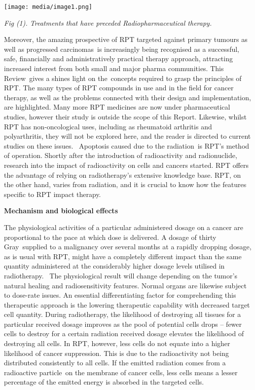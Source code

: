 \documentclass[
]{article}
\begin{document}
\texttt{[image: media/image1.png]}

\emph{Fig (1). Treatments that have preceded Radiopharmaceutical
therapy.}

Moreover, the amazing prospective of RPT targeted against primary
tumours as well as progressed carcinomas~is increasingly being
recognised as a successful, safe, financially and administratively
practical therapy approach, attracting increased interest from both
small and major pharma communities. This Review~gives a shines light on
the~concepts required to grasp the principles of RPT. The many types of
RPT compounds in use and in the field for cancer therapy, as well as the
problems connected with their design and implementation, are
highlighted. Many more RPT medicines are now under pharmaceutical
studies, however their study is outside the scope of this Report.
Likewise, whilst RPT has non-oncological uses, including as rheumatoid
arthritis and polyarthritis, they will not be explored here, and the
reader is directed to current studies on these issues. ~Apoptosis caused
due to the radiation~is RPT's method of operation. Shortly after the
introduction of radioactivity and radionuclide, research into the impact
of radioactivity on cells and cancers started. RPT offers the advantage
of relying on radiotherapy's extensive knowledge base. RPT, on the other
hand, varies from radiation, and it is crucial to know how the features
specific to RPT impact therapy.

\textbf{Mechanism and biological effects}

The physiological activities of a particular administered dosage on a
cancer are proportional to the pace at which dose is delivered. A dosage
of thirty Gray~supplied to a malignancy over several months at a rapidly
dropping dosage, as is usual with RPT, might have a completely different
impact than the same quantity administered at the considerably higher
dosage levels utilised in radiotherapy.~ The physiological result will
change depending on the tumor's natural healing and radiosensitivity
features. Normal organs are likewise subject to dose-rate issues. An
essential differentiating factor for comprehending this therapeutic
approach is the lowering therapeutic capability with decreased target
cell quantity. During radiotherapy, the likelihood of destroying all
tissues for a particular received dosage improves as the pool of
potential cells drops -- fewer cells to destroy for a certain radiation
received dosage elevates the likelihood of destroying all cells. In RPT,
however, less cells do not equate into a higher likelihood of cancer
suppression. This is due to the radioactivity not being distributed
consistently to all cells. If the emitted radiation comes from a
radioactive particle~on the membrane of cancer cells, less cells means a
lesser percentage of the emitted energy is absorbed in the targeted
cells.
\end{document}
